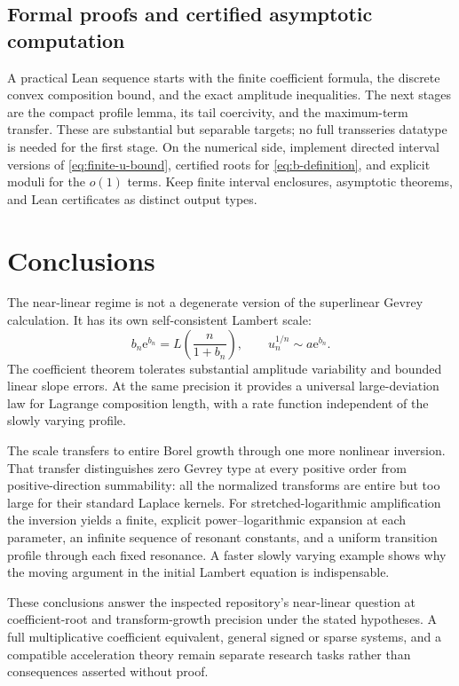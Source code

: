 \documentclass[11pt,a4paper]{article}
\numberwithin{equation}{section}
\theoremstyle{definition}
\theoremstyle{remark}
\newcommand{\ee}{\mathrm e}
\begin{document}
\subsection{Formal proofs and certified asymptotic computation}
A practical Lean sequence starts with the finite coefficient formula,
the discrete convex composition bound, and the exact amplitude
inequalities. The next stages are the compact profile lemma, its tail
coercivity, and the maximum-term transfer. These are substantial but
separable targets; no full transseries datatype is needed for the first
stage. On the numerical side, implement directed interval versions of
\eqref{eq:finite-u-bound}, certified roots for \eqref{eq:b-definition},
and explicit moduli for the $o(1)$ terms. Keep finite interval enclosures,
asymptotic theorems, and Lean certificates as distinct output types.

\section{Conclusions}

The near-linear regime is not a degenerate version of the superlinear
Gevrey calculation. It has its own self-consistent Lambert scale:
\[
 b_n\ee^{b_n}=L\left(\frac n{1+b_n}\right),\qquad
 u_n^{1/n}\sim a\ee^{b_n}.
\]
The coefficient theorem tolerates substantial amplitude variability and
bounded linear slope errors. At the same precision it provides a universal
large-deviation law for Lagrange composition length, with a rate function
independent of the slowly varying profile.

The scale transfers to entire Borel growth through one more nonlinear
inversion. That transfer distinguishes zero Gevrey type at every positive
order from positive-direction summability: all the normalized transforms
are entire but too large for their standard Laplace kernels. For
stretched-logarithmic amplification the inversion yields a finite,
explicit power--logarithmic expansion at each parameter, an infinite
sequence of resonant constants, and a uniform transition profile through
each fixed resonance. A faster slowly varying example shows why the
moving argument in the initial Lambert equation is indispensable.

These conclusions answer the inspected repository's near-linear question
at coefficient-root and transform-growth precision under the stated
hypotheses. A full multiplicative coefficient equivalent, general signed
or sparse systems, and a compatible acceleration theory remain separate
research tasks rather than consequences asserted without proof.
\end{document}
